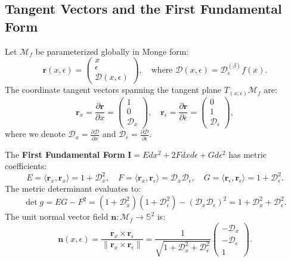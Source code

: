 \documentclass[11pt,a4paper]{article}
\theoremstyle{definition}
\begin{document}
\subsection{Tangent Vectors and the First Fundamental Form}
Let $\mathcal{M}_f$ be parameterized globally in Monge form:
\begin{equation}
\mathbf{r}(x, \epsilon) = \begin{pmatrix} x \\ \epsilon \\ \mathcal{D}(x, \epsilon) \end{pmatrix}, \quad \text{where } \mathcal{D}(x, \epsilon) = \mathcal{D}_\epsilon^{(\beta)} f(x).
\end{equation}
The coordinate tangent vectors spanning the tangent plane $T_{(x, \epsilon)}\mathcal{M}_f$ are:
\begin{equation}
\mathbf{r}_x = \frac{\partial \mathbf{r}}{\partial x} = \begin{pmatrix} 1 \\ 0 \\ \mathcal{D}_x \end{pmatrix}, \quad \mathbf{r}_\epsilon = \frac{\partial \mathbf{r}}{\partial \epsilon} = \begin{pmatrix} 0 \\ 1 \\ \mathcal{D}_\epsilon \end{pmatrix},
\end{equation}
where we denote $\mathcal{D}_x = \frac{\partial \mathcal{D}}{\partial x}$ and $\mathcal{D}_\epsilon = \frac{\partial \mathcal{D}}{\partial \epsilon}$.

The \textbf{First Fundamental Form} $\mathbf{I} = E dx^2 + 2F dx d\epsilon + G d\epsilon^2$ has metric coefficients:
\begin{equation}
E = \langle \mathbf{r}_x, \mathbf{r}_x \rangle = 1 + \mathcal{D}_x^2, \quad F = \langle \mathbf{r}_x, \mathbf{r}_\epsilon \rangle = \mathcal{D}_x \mathcal{D}_\epsilon, \quad G = \langle \mathbf{r}_\epsilon, \mathbf{r}_\epsilon \rangle = 1 + \mathcal{D}_\epsilon^2.
\end{equation}
The metric determinant evaluates to:
\begin{equation}
\det g = EG - F^2 = (1 + \mathcal{D}_x^2)(1 + \mathcal{D}_\epsilon^2) - (\mathcal{D}_x \mathcal{D}_\epsilon)^2 = 1 + \mathcal{D}_x^2 + \mathcal{D}_\epsilon^2.
\end{equation}
The unit normal vector field $\mathbf{n}: \mathcal{M}_f \to \mathbb{S}^2$ is:
\begin{equation}
\mathbf{n}(x, \epsilon) = \frac{\mathbf{r}_x \times \mathbf{r}_\epsilon}{\|\mathbf{r}_x \times \mathbf{r}_\epsilon\|} = \frac{1}{\sqrt{1 + \mathcal{D}_x^2 + \mathcal{D}_\epsilon^2}} \begin{pmatrix} -\mathcal{D}_x \\ -\mathcal{D}_\epsilon \\ 1 \end{pmatrix}.
\end{equation}
\end{document}
